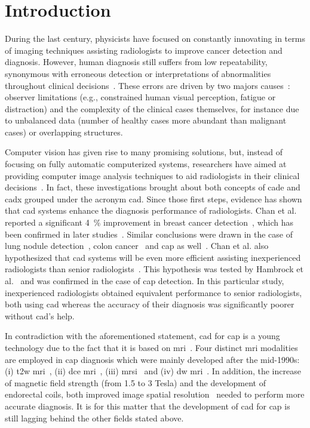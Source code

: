 \section{Introduction} \label{sec:introduction}

During the last century, physicists have focused on constantly innovating in terms of imaging techniques assisting radiologists to improve cancer detection and diagnosis. However, human diagnosis still suffers from low repeatability, synonymous with erroneous detection or interpretations of abnormalities throughout clinical decisions~\cite{Giger2008,Hambrock2013}. These errors are driven by two majors causes~\cite{Giger2008}: observer limitations (e.g., constrained human visual perception, fatigue or distraction) and the complexity of the clinical cases themselves, for instance due to unbalanced data (number of healthy cases more abundant than malignant cases) or overlapping structures.

Computer vision has given rise to many promising solutions, but, instead of focusing on fully automatic computerized systems, researchers have aimed at providing computer image analysis techniques to aid radiologists in their clinical decisions~\cite{Giger2008}. In fact, these investigations brought about both concepts of \ac{cade} and \ac{cadx} grouped under the acronym \acs{cad}. Since those first steps, evidence has shown that \acs{cad} systems enhance the diagnosis performance of radiologists. Chan et al. reported a significant 4~\% improvement in breast cancer detection~\cite{Chan1999}, which has been confirmed in later studies~\cite{Dean2006}. Similar conclusions were drawn in the case of lung nodule detection~\cite{Li2004}, colon cancer~\cite{Petrick2008} and \ac{cap} as well~\cite{Hambrock2013}. Chan et al. also hypothesized that \acs{cad} systems will be even more efficient assisting inexperienced radiologists than senior radiologists~\cite{Chan1999}. This hypothesis was tested by Hambrock et al.~\cite{Hambrock2013} and was confirmed in the case of \ac{cap} detection. In this particular study, inexperienced radiologists obtained equivalent performance to senior radiologists, both using \acs{cad} whereas the accuracy of their diagnosis was significantly poorer without \acs{cad}'s help.

In contradiction with the aforementioned statement, \acs{cad} for \ac{cap} is a young technology due to the fact that it is based on \ac{mri}~\cite{Hegde2013}. Four distinct \ac{mri} modalities are employed in \ac{cap} diagnosis which were mainly developed after the mid-1990s: (i) \ac{t2w} \ac{mri}~\cite{Hricak1983}, (ii) \ac{dce} \ac{mri}~\cite{HuchBoni1995}, (iii) \ac{mrsi}~\cite{Kurhanewicz1996} and (iv) \ac{dw} \ac{mri}~\cite{Scheidler1999}. In addition, the increase of magnetic field strength (from 1.5 to 3 Tesla) and the development of endorectal coils, both improved image spatial resolution~\cite{Swanson2001} needed to perform more accurate diagnosis. It is for this matter that the development of \acs{cad} for \ac{cap} is still lagging behind the other fields stated above.

